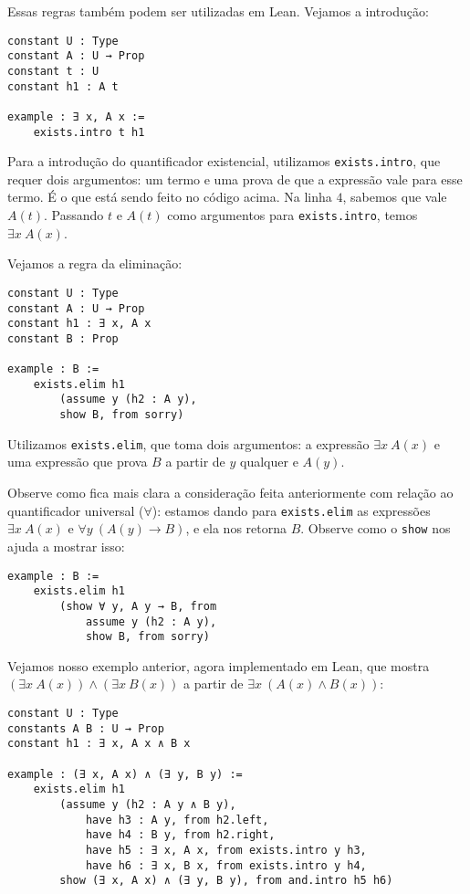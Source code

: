         Essas regras também podem ser utilizadas em Lean. Vejamos a introdução:

        \begin{lstlisting}
constant U : Type
constant A : U → Prop
constant t : U
constant h1 : A t

example : ∃ x, A x :=
    exists.intro t h1
\end{lstlisting}

        Para a introdução do quantificador existencial, utilizamos \lstinline{exists.intro}, que requer dois argumentos:
        um termo e uma prova de que a expressão vale para esse termo. É o que está sendo feito no código acima. Na linha $4$, sabemos que vale $A(t)$. Passando $t$ e $A(t)$
        como argumentos para \lstinline{exists.intro}, temos $\exists x \ A(x)$.

        Vejamos a regra da eliminação:

        \begin{lstlisting}
constant U : Type
constant A : U → Prop
constant h1 : ∃ x, A x
constant B : Prop

example : B :=
    exists.elim h1
        (assume y (h2 : A y),
        show B, from sorry)
\end{lstlisting}

        Utilizamos \lstinline{exists.elim}, que toma dois argumentos: a expressão $\exists x \ A(x)$ e uma expressão que prova $B$ a partir de $y$ qualquer e $A(y)$.
        
        Observe como fica mais clara a consideração feita anteriormente com relação ao quantificador universal ($\forall$): estamos dando para \lstinline{exists.elim} as expressões $\exists x \ A(x)$ e $\forall y \ (A(y) \to B)$, e ela nos retorna $B$. Observe como o \lstinline{show} nos ajuda a mostrar isso:

        \begin{lstlisting}
example : B :=
    exists.elim h1
        (show ∀ y, A y → B, from
            assume y (h2 : A y),
            show B, from sorry)
\end{lstlisting}

        Vejamos nosso exemplo anterior, agora implementado em Lean, que mostra $(\exists x \ A(x)) \land (\exists x \ B(x))$ a partir de $\exists x \ (A(x) \land B(x))$:
        \begin{lstlisting}
constant U : Type
constants A B : U → Prop
constant h1 : ∃ x, A x ∧ B x

example : (∃ x, A x) ∧ (∃ y, B y) :=
    exists.elim h1
        (assume y (h2 : A y ∧ B y),
            have h3 : A y, from h2.left,
            have h4 : B y, from h2.right,
            have h5 : ∃ x, A x, from exists.intro y h3,
            have h6 : ∃ x, B x, from exists.intro y h4,
        show (∃ x, A x) ∧ (∃ y, B y), from and.intro h5 h6)
\end{lstlisting}

